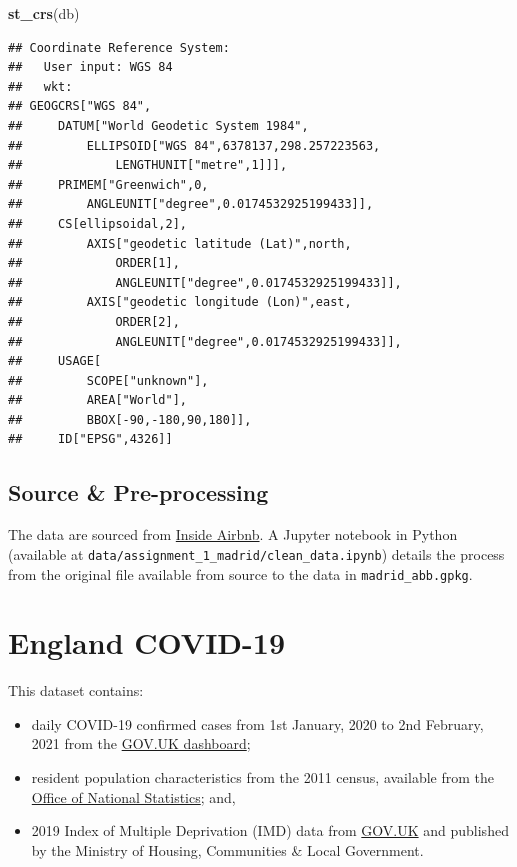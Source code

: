 \documentclass[
]{book}
\newenvironment{Shaded}{\begin{snugshade}}{\end{snugshade}}
\newcommand{\KeywordTok}[1]{\textcolor[rgb]{0.13,0.29,0.53}{\textbf{#1}}}
\newcommand{\NormalTok}[1]{#1}
\begin{document}
\begin{Shaded}
\begin{Highlighting}[]
\KeywordTok{st_crs}\NormalTok{(db)}
\end{Highlighting}
\end{Shaded}

\begin{verbatim}
## Coordinate Reference System:
##   User input: WGS 84 
##   wkt:
## GEOGCRS["WGS 84",
##     DATUM["World Geodetic System 1984",
##         ELLIPSOID["WGS 84",6378137,298.257223563,
##             LENGTHUNIT["metre",1]]],
##     PRIMEM["Greenwich",0,
##         ANGLEUNIT["degree",0.0174532925199433]],
##     CS[ellipsoidal,2],
##         AXIS["geodetic latitude (Lat)",north,
##             ORDER[1],
##             ANGLEUNIT["degree",0.0174532925199433]],
##         AXIS["geodetic longitude (Lon)",east,
##             ORDER[2],
##             ANGLEUNIT["degree",0.0174532925199433]],
##     USAGE[
##         SCOPE["unknown"],
##         AREA["World"],
##         BBOX[-90,-180,90,180]],
##     ID["EPSG",4326]]
\end{verbatim}

\hypertarget{source-pre-processing}{%
\subsection*{Source \& Pre-processing}\label{source-pre-processing}}

The data are sourced from \href{http://insideairbnb.com/}{Inside Airbnb}. A Jupyter notebook in Python (available at \texttt{data/assignment\_1\_madrid/clean\_data.ipynb}) details the process from the original file available from source to the data in \texttt{madrid\_abb.gpkg}.

\hypertarget{england-covid-19}{%
\section{England COVID-19}\label{england-covid-19}}

This dataset contains:

\begin{itemize}
\item
  daily COVID-19 confirmed cases from 1st January, 2020 to 2nd February, 2021 from the \href{https://coronavirus.data.gov.uk}{GOV.UK dashboard};
\item
  resident population characteristics from the 2011 census, available from the \href{https://www.nomisweb.co.uk/home/census2001.asp}{Office of National Statistics}; and,
\item
  2019 Index of Multiple Deprivation (IMD) data from \href{https://www.gov.uk/government/statistics/english-indices-of-deprivation-2019}{GOV.UK} and published by the Ministry of Housing, Communities \& Local Government.
\end{itemize}
\end{document}
